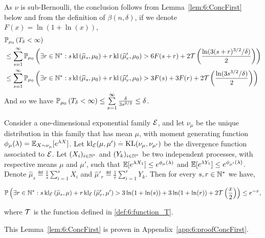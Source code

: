 \begin{smallproof}
As $\nu$ is sub-Bernoulli, the conclusion follows from Lemma~\ref{lem:6:ConcFirst} below and from the definition of $\beta(n,\delta)$, if we denote $F(x)=\ln(1+\ln(x))$,
%
\begin{align*}
    &\mathbb{P}_{\mu_0}\left(T_{\delta} < \infty\right) \\
    & \leq \sum_{s =1}^{\infty} \mathbb{P}_{\mu_0}\left(\exists r \in \mathbb{N}^* : s \, \mathrm{kl}\left(\widehat{\mu}_{s},\mu_0\right) + r \, \mathrm{kl}\left(\widehat{\mu}'_{r},\mu_0\right) > 6F(s+r)+ 2 \mathcal{T}\left(\frac{\ln(3(s+r)^{3/2}/\delta)}{2}\right)\right)\\
    & \leq \sum_{s =1}^{\infty} \mathbb{P}_{\mu_0}\left(\exists r \in \mathbb{N}^* : s \, \mathrm{kl}\left(\widehat{\mu}_{s},\mu_0\right) + r \, \mathrm{kl}\left(\widehat{\mu}'_{r},\mu_0\right) > 3F(s)+3F(r) + 2 \mathcal{T}\left(\frac{\ln(3s^{3/2}/\delta)}{2}\right)\right)
\end{align*}
%
And so we have $\mathbb{P}_{\mu_0}\left(T_{\delta} < \infty\right) \leq \sum\limits_{s =1}^{\infty} \frac{\delta}{3s^{3/2}} \leq \delta$.
%
\end{smallproof}

\begin{lemma}\label{lem:6:ConcFirst}
\begin{leftbar}[lemmabar]  %
    Consider a one-dimensional exponential family $\mathcal{E}$,
    and let $\nu_{\mu}$ be the unique distribution in this family that has mean $\mu$,
    with moment generating function $\phi_\mu(\lambda) = \mathbb{E}_{X \sim \nu_{\mu}}[e^{\lambda X}]$.
    Let $\mathrm{kl}_{\mathcal{E}}(\mu,\mu') \overset{.}{=} \mathrm{KL}(\nu_{\mu},\nu_{\mu'})$ be the divergence function associated to $\mathcal{E}$.
    Let $(X_i)_{i \in \mathbb{N}^*}$ and $(Y_k)_{i \in \mathbb{N}^*}$ be two independent \iid{} processes, with respective means $\mu$ and $\mu'$, such that
    $\mathbb{E}[e^{\lambda X_1}] \leq e^{\phi_{\mu}(\lambda)}$ and $\mathbb{E}[e^{\lambda Y_1}] \leq e^{\phi_{\mu'}(\lambda)}$.
    Denote $\widehat{\mu}_s \eqdef \frac{1}{s}\sum\limits_{i=1}^s X_i$ and $\widehat{\mu}'_r \eqdef \frac{1}{r}\sum\limits_{i=1}^r Y_k$.
    Then for every $s,r \in \mathbb{N}^*$ we have,
    \begin{small}
        \begin{equation}
            \mathbb{P}\left(\exists r \in \mathbb{N}^* : s \, \mathrm{kl}_{\mathcal{E}}\left(\widehat{\mu}_{s},\mu\right) + r \, \mathrm{kl}_{\mathcal{E}}\left(\widehat{\mu}_r',\mu'\right) > 3\ln(1+\ln(s)) + 3\ln(1+\ln(r)) + 2\mathcal{T}\left(\frac{x}{2}\right)\right)\leq e^{-x},
        \end{equation}
    \end{small}
    where $\mathcal{T}$ is the function defined in \eqref{def:6:function_T}.
\end{leftbar}  %
\end{lemma}
\begin{smallproof}
    This Lemma~\ref{lem:6:ConcFirst} is proven in Appendix~\ref{app:6:proofConcFirst}.
\end{smallproof}


